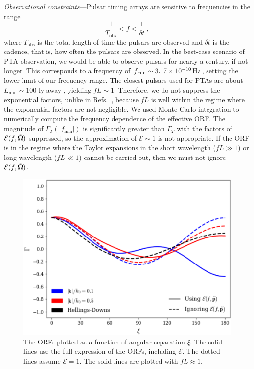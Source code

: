 \documentclass[prd,twocolumn,aps,psfig,nofootinbib,nobibnotes,superscriptaddress,preprintnumbers,times]{revtex4-2}
\newcommand{\Hz}{\,{\rm Hz}}
\begin{document}
\textit{Observational constraints}---Pulsar timing arrays are sensitive to frequencies in the range \cite{Moore:2014lga}
\begin{equation}\label{eq:freqrange}
    \frac{1}{T_{\text{obs}}} < f < \frac{1}{\delta t}\ ,
\end{equation} 
where $T_{\text{obs}}$ is the total length of time the pulsars are observed and $\delta t$ is the cadence, that is, how often the pulsars are observed.  
In the best-case scenario of PTA observation, we would be able to observe pulsars for nearly a century, if not longer. This corresponds to a frequency of $f_{\text{min}} \sim 3.17 \times 10^{-10} \Hz$, setting the lower limit of our frequency range. The closest pulsars used for PTAs are about $L_{\text{min}} \sim 100$ ly away \cite{Anholm:2008wy}, yielding $fL \sim 1$. Therefore, we do not suppress the exponential factors, unlike in Refs.~\cite{Liang:2021bct,Arjona:2024cex}, because $fL$ is well within the regime where the exponential factors are not negligible.
We used Monte-Carlo integration to numerically compute the frequency dependence of the effective ORF. The magnitude of $\Gamma_T(|f_{\text{min}}|)$ is significantly greater than $\Gamma_T$ with the factors of $\mathcal{E}(f, \hat{\bf \Omega})$ suppressed, so the approximation of $\mathcal{E}\sim 1$ is not appropriate. If the ORF is in the regime where the Taylor expansions in the short wavelength ($fL \gg 1$) or long wavelength ($fL \ll 1$) cannot be carried out, then we must not ignore $\mathcal{E}(f, \hat{\bf \Omega})$.
\begin{figure}[ht]
    \centering
    \includegraphics[scale=0.48]{fig1.pdf}
    \caption{The ORFs plotted as a function of angular separation $\xi$. The solid lines use the full expression of the ORFs, including $\mathcal{E}$. The dotted lines assume $\mathcal{E}=1$. The solid lines are plotted with $fL \approx 1$.}
    \label{fig:orfs}
\end{figure}
\end{document}
